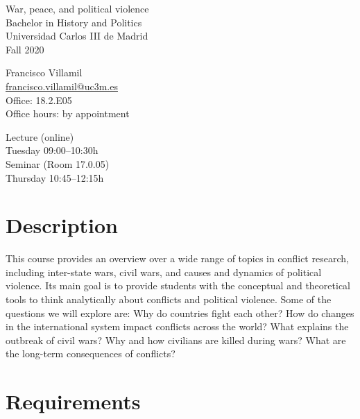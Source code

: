 \documentclass[12pt, a4paper]{article}
\begin{document}
\begin{center}
{\Large War, peace, and political violence}\\\vspace{10pt}
Bachelor in History and Politics\\
Universidad Carlos III de Madrid\\
Fall 2020\\
\end{center}

\vspace{20pt}

\begin{minipage}{0.49\textwidth}
\centering
Francisco Villamil\\
\href{francisco.villamil@uc3m.es}{francisco.villamil@uc3m.es}\\
Office: 18.2.E05\\
Office hours: by appointment
\end{minipage}\hfill
\begin{minipage}{0.49\textwidth}
\centering
Lecture (online)\\Tuesday 09:00--10:30h\\\vspace{5pt}
Seminar (Room 17.0.05)\\Thursday 10:45--12:15h\\
\end{minipage}


\vspace{10pt}
\section{Description}

This course provides an overview over a wide range of topics in conflict research, including inter-state wars, civil wars, and causes and dynamics of political violence.
Its main goal is to provide students with the conceptual and theoretical tools to think analytically about conflicts and political violence. Some of the questions we will explore are: Why do countries fight each other? How do changes in the international system impact conflicts across the world? What explains the outbreak of civil wars? Why and how civilians are killed during wars? What are the long-term consequences of conflicts?

\section{Requirements}
\end{document}
